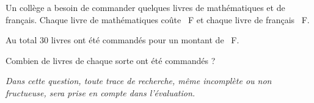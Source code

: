 
\medskip

Un collège a besoin de commander quelques livres de mathématiques et de français.
Chaque livre de mathématiques coûte ~F et chaque livre de français ~F.

Au total 30 livres ont été commandés pour un montant de ~F.

Combien de livres de chaque sorte ont été commandés ?

\emph{Dans cette question, toute trace de recherche, même incomplète ou non fructueuse, sera prise en compte dans l'évaluation.}

\vspace{0,5cm}


